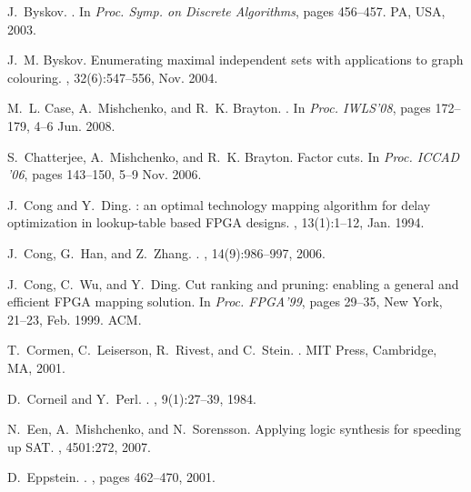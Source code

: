 \documentclass[journal]{IEEEtran}
\begin{document}

\begin{thebibliography}{10}

J.~Byskov.
.
\newblock In {\em Proc. Symp. on Discrete Algorithms}, pages 456--457. PA, USA,
  2003.

J.~M. Byskov.
\newblock Enumerating maximal independent sets with applications to graph
  colouring.
, 32(6):547--556, Nov. 2004.

M.~L. Case, A.~Mishchenko, and R.~K. Brayton.
.
\newblock In {\em Proc. IWLS'08}, pages 172--179, 4--6 Jun. 2008.

S.~Chatterjee, A.~Mishchenko, and R.~K. Brayton.
\newblock Factor cuts.
\newblock In {\em Proc. ICCAD '06}, pages 143--150, 5--9 Nov. 2006.

J.~Cong and Y.~Ding.
: an optimal technology mapping algorithm for delay
  optimization in lookup-table based {FPGA} designs.
, 13(1):1--12, Jan. 1994.

J.~Cong, G.~Han, and Z.~Zhang.
.
, 14(9):986--997, 2006.

J.~Cong, C.~Wu, and Y.~Ding.
\newblock Cut ranking and pruning: enabling a general and efficient {FPGA}
  mapping solution.
\newblock In {\em Proc. FPGA'99}, pages 29--35, New York, 21--23, Feb. 1999.
  ACM.

T.~Cormen, C.~Leiserson, R.~Rivest, and C.~Stein.
.
\newblock MIT Press, Cambridge, MA, 2001.

D.~Corneil and Y.~Perl.
.
, 9(1):27--39, 1984.

N.~Een, A.~Mishchenko, and N.~Sorensson.
\newblock Applying logic synthesis for speeding up {SAT}.
, 4501:272, 2007.

D.~Eppstein.
.
, pages 462--470, 2001.


\end{thebibliography}
\end{document}
